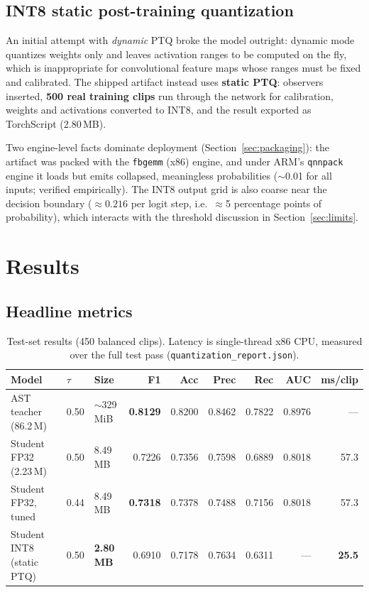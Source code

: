 \documentclass[11pt,a4paper]{article}
\begin{document}
\subsection{INT8 static post-training quantization}\label{sec:quant}

An initial attempt with \emph{dynamic} PTQ broke the model outright: dynamic
mode quantizes weights only and leaves activation ranges to be computed on the
fly, which is inappropriate for convolutional feature maps whose ranges must
be fixed and calibrated. The shipped artifact instead uses \textbf{static
PTQ}: observers inserted, \textbf{500 real training clips} run through the
network for calibration, weights and activations converted to INT8, and the
result exported as TorchScript (2.80\,MB).

Two engine-level facts dominate deployment (Section~\ref{sec:packaging}): the
artifact was packed with the \texttt{fbgemm} (x86) engine, and under ARM's
\texttt{qnnpack} engine it loads but emits collapsed, meaningless
probabilities ($\sim$0.01 for all inputs; verified empirically). The INT8
output grid is also coarse near the decision boundary
($\approx 0.216$ per logit step, i.e.\ $\approx$5 percentage points of
probability), which interacts with the threshold discussion in
Section~\ref{sec:limits}.

\section{Results}\label{sec:results}

\subsection{Headline metrics}

\begin{table}[h]
\centering\small
\setlength{\tabcolsep}{4.5pt}
\begin{tabular}{@{}lllrrrrrr@{}}
\toprule
\textbf{Model} & $\tau$ & \textbf{Size} & \textbf{F1} & \textbf{Acc} &
\textbf{Prec} & \textbf{Rec} & \textbf{AUC} & \textbf{ms/clip} \\
\midrule
AST teacher (86.2\,M)        & 0.50 & $\sim$329\,MiB & \textbf{0.8129} & 0.8200 & 0.8462 & 0.7822 & 0.8976 & --- \\
Student FP32 (2.23\,M)       & 0.50 & 8.49\,MB       & 0.7226 & 0.7356 & 0.7598 & 0.6889 & 0.8018 & 57.3 \\
Student FP32, tuned          & 0.44 & 8.49\,MB       & \textbf{0.7318} & 0.7378 & 0.7488 & 0.7156 & 0.8018 & 57.3 \\
Student INT8 (static PTQ)    & 0.50 & \textbf{2.80\,MB} & 0.6910 & 0.7178 & 0.7634 & 0.6311 & --- & \textbf{25.5} \\
\bottomrule
\end{tabular}
\caption{Test-set results (450 balanced clips). Latency is single-thread x86
CPU, measured over the full test pass
(\texttt{quantization\_report.json}).}
\label{tab:results}
\end{table}
\end{document}
